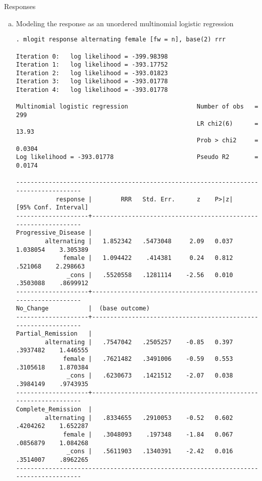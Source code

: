\documentclass{article}
\begin{document}
Responses

\begin{enumerate}[a.]
\item Modeling the response as an unordered multinomial logistic regression

\begin{verbatim}
. mlogit response alternating female [fw = n], base(2) rrr

Iteration 0:   log likelihood = -399.98398
Iteration 1:   log likelihood = -393.17752
Iteration 2:   log likelihood = -393.01823
Iteration 3:   log likelihood = -393.01778
Iteration 4:   log likelihood = -393.01778

Multinomial logistic regression                   Number of obs   =        299
                                                  LR chi2(6)      =      13.93
                                                  Prob > chi2     =     0.0304
Log likelihood = -393.01778                       Pseudo R2       =     0.0174

-------------------------------------------------------------------------------------
           response |        RRR   Std. Err.      z    P>|z|     [95% Conf. Interval]
--------------------+----------------------------------------------------------------
Progressive_Disease |
        alternating |   1.852342   .5473048     2.09   0.037     1.038054    3.305389
             female |   1.094422    .414381     0.24   0.812      .521068    2.298663
              _cons |   .5520558   .1281114    -2.56   0.010     .3503088    .8699912
--------------------+----------------------------------------------------------------
No_Change           |  (base outcome)
--------------------+----------------------------------------------------------------
Partial_Remission   |
        alternating |   .7547042   .2505257    -0.85   0.397     .3937482    1.446555
             female |   .7621482   .3491006    -0.59   0.553     .3105618    1.870384
              _cons |   .6230673   .1421512    -2.07   0.038     .3984149    .9743935
--------------------+----------------------------------------------------------------
Complete_Remission  |
        alternating |   .8334655   .2910053    -0.52   0.602     .4204262    1.652287
             female |   .3048093    .197348    -1.84   0.067     .0856879    1.084268
              _cons |   .5611903   .1340391    -2.42   0.016     .3514007    .8962265
-------------------------------------------------------------------------------------
\end{verbatim}


\end{enumerate}
\end{document}
